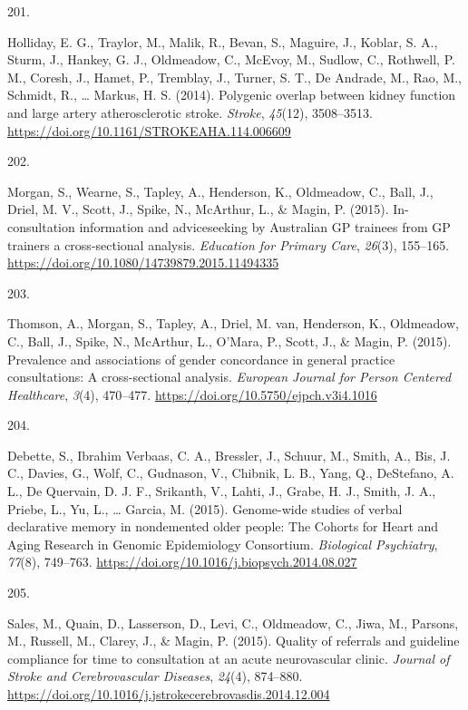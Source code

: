 \documentclass[11pt, a4paper]{awesome-cv}
\newlength{\csllabelwidth}
\newcommand{\CSLLeftMargin}[1]{\parbox[t]{\csllabelwidth}{#1}}
\newcommand{\CSLRightInline}[1]{\parbox[t]{\linewidth - \csllabelwidth}{#1}}
\begin{document}
\leavevmode\hypertarget{ref-holliday_polygenic_2014}{}%
\CSLLeftMargin{201. }
\CSLRightInline{Holliday, E. G., Traylor, M., Malik, R., Bevan, S.,
Maguire, J., Koblar, S. A., Sturm, J., Hankey, G. J., Oldmeadow, C.,
McEvoy, M., Sudlow, C., Rothwell, P. M., Coresh, J., Hamet, P.,
Tremblay, J., Turner, S. T., De Andrade, M., Rao, M., Schmidt, R.,
\ldots{} Markus, H. S. (2014). Polygenic overlap between kidney function
and large artery atherosclerotic stroke. \emph{Stroke}, \emph{45}(12),
3508--3513. \url{https://doi.org/10.1161/STROKEAHA.114.006609}}

\leavevmode\hypertarget{ref-morgan_-consultation_2015}{}%
\CSLLeftMargin{202. }
\CSLRightInline{Morgan, S., Wearne, S., Tapley, A., Henderson, K.,
Oldmeadow, C., Ball, J., Driel, M. V., Scott, J., Spike, N., McArthur,
L., \& Magin, P. (2015). In-consultation information and adviceseeking
by Australian GP trainees from GP trainers a cross-sectional analysis.
\emph{Education for Primary Care}, \emph{26}(3), 155--165.
\url{https://doi.org/10.1080/14739879.2015.11494335}}

\leavevmode\hypertarget{ref-thomson_prevalence_2015}{}%
\CSLLeftMargin{203. }
\CSLRightInline{Thomson, A., Morgan, S., Tapley, A., Driel, M. van,
Henderson, K., Oldmeadow, C., Ball, J., Spike, N., McArthur, L., O'Mara,
P., Scott, J., \& Magin, P. (2015). Prevalence and associations of
gender concordance in general practice consultations: A cross-sectional
analysis. \emph{European Journal for Person Centered Healthcare},
\emph{3}(4), 470--477. \url{https://doi.org/10.5750/ejpch.v3i4.1016}}

\leavevmode\hypertarget{ref-debette_genome-wide_2015}{}%
\CSLLeftMargin{204. }
\CSLRightInline{Debette, S., Ibrahim Verbaas, C. A., Bressler, J.,
Schuur, M., Smith, A., Bis, J. C., Davies, G., Wolf, C., Gudnason, V.,
Chibnik, L. B., Yang, Q., DeStefano, A. L., De Quervain, D. J. F.,
Srikanth, V., Lahti, J., Grabe, H. J., Smith, J. A., Priebe, L., Yu, L.,
\ldots{} Garcia, M. (2015). Genome-wide studies of verbal declarative
memory in nondemented older people: The Cohorts for Heart and Aging
Research in Genomic Epidemiology Consortium. \emph{Biological
Psychiatry}, \emph{77}(8), 749--763.
\url{https://doi.org/10.1016/j.biopsych.2014.08.027}}

\leavevmode\hypertarget{ref-sales_quality_2015}{}%
\CSLLeftMargin{205. }
\CSLRightInline{Sales, M., Quain, D., Lasserson, D., Levi, C.,
Oldmeadow, C., Jiwa, M., Parsons, M., Russell, M., Clarey, J., \& Magin,
P. (2015). Quality of referrals and guideline compliance for time to
consultation at an acute neurovascular clinic. \emph{Journal of Stroke
and Cerebrovascular Diseases}, \emph{24}(4), 874--880.
\url{https://doi.org/10.1016/j.jstrokecerebrovasdis.2014.12.004}}
\end{document}

